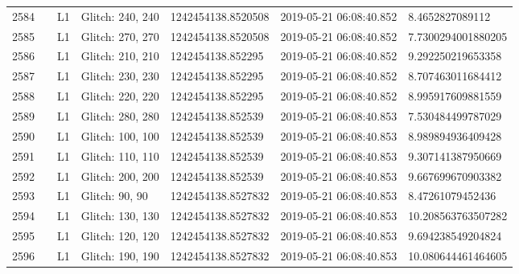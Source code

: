 \begin{longtable}{lllllll}
2584 &                                                    &       L1 &  Glitch: 240, 240 &  1242454138.8520508 &  2019-05-21 06:08:40.852 &     8.4652827089112 \\
2585 &                                                    &       L1 &  Glitch: 270, 270 &  1242454138.8520508 &  2019-05-21 06:08:40.852 &  7.7300294001880205 \\
2586 &                                                    &       L1 &  Glitch: 210, 210 &   1242454138.852295 &  2019-05-21 06:08:40.852 &   9.292250219653358 \\
2587 &                                                    &       L1 &  Glitch: 230, 230 &   1242454138.852295 &  2019-05-21 06:08:40.852 &   8.707463011684412 \\
2588 &                                                    &       L1 &  Glitch: 220, 220 &   1242454138.852295 &  2019-05-21 06:08:40.852 &   8.995917609881559 \\
2589 &                                                    &       L1 &  Glitch: 280, 280 &   1242454138.852539 &  2019-05-21 06:08:40.853 &   7.530484499787029 \\
2590 &                                                    &       L1 &  Glitch: 100, 100 &   1242454138.852539 &  2019-05-21 06:08:40.853 &   8.989894936409428 \\
2591 &                                                    &       L1 &  Glitch: 110, 110 &   1242454138.852539 &  2019-05-21 06:08:40.853 &   9.307141387950669 \\
2592 &                                                    &       L1 &  Glitch: 200, 200 &   1242454138.852539 &  2019-05-21 06:08:40.853 &   9.667699670903382 \\
2593 &                                                    &       L1 &    Glitch: 90, 90 &  1242454138.8527832 &  2019-05-21 06:08:40.853 &    8.47261079452436 \\
2594 &                                                    &       L1 &  Glitch: 130, 130 &  1242454138.8527832 &  2019-05-21 06:08:40.853 &  10.208563763507282 \\
2595 &                                                    &       L1 &  Glitch: 120, 120 &  1242454138.8527832 &  2019-05-21 06:08:40.853 &   9.694238549204824 \\
2596 &                                                    &       L1 &  Glitch: 190, 190 &  1242454138.8527832 &  2019-05-21 06:08:40.853 &  10.080644461464605 \\

\end{longtable}

